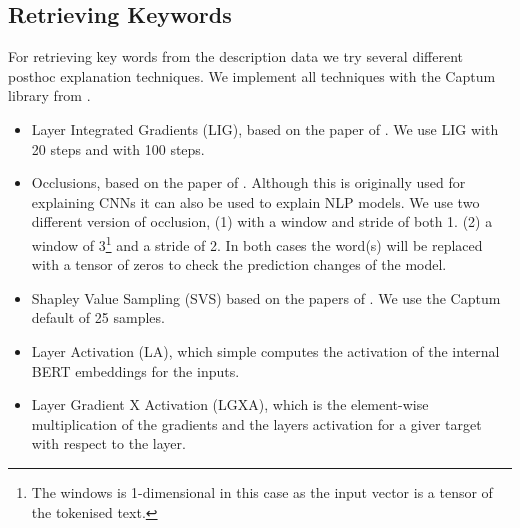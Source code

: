 \documentclass[a4paper, 12pt, oneside]{book} %
\begin{document}

\subsection{Retrieving Keywords} \label{par:keywords}

For retrieving key words from the description data we try several different posthoc explanation techniques. We implement all techniques with the Captum library from \textcite{kokhlikyan_captum_2020}.
\begin{itemize}
    \item Layer Integrated Gradients (LIG), based on the paper of \textcite{sundararajan_axiomatic_2017}. We use LIG with 20 steps and with 100 steps.
    \item Occlusions, based on the paper of \textcite{fleet_visualizing_2014}. Although this is originally used for explaining CNNs it can also be used to explain NLP models. We use two different version of occlusion, (1) with a window and stride of both 1. (2) a window of 3\footnote{The windows is 1-dimensional in this case as the input vector is a tensor of the tokenised text.} and a stride of 2. In both cases the word(s) will be replaced with a tensor of zeros to check the prediction changes of the model. 
    \item Shapley Value Sampling (SVS) based on the papers of \textcite{castro_polynomial_2009, strumbelj_efficient_2010}. We use the Captum default of 25 samples.
    \item Layer Activation (LA), which simple computes the activation of the internal BERT embeddings for the inputs.
    \item Layer Gradient X Activation (LGXA), which is the element-wise multiplication of the gradients and the layers activation for a giver target with respect to the layer.
\end{itemize}
\end{document}
